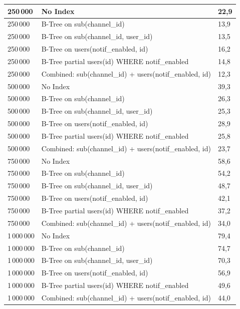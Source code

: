 \begin{longtable}{|p{2.4cm}|p{9.9cm}|p{2.3cm}|}
    \hline
    250\,000 & No Index & 22,9 \\
    \hline
    250\,000 & B-Tree on sub(channel\_id) & 13,9 \\
    \hline
    250\,000 & B-Tree on sub(channel\_id, user\_id) & 13,5 \\
    \hline
    250\,000 & B-Tree on users(notif\_enabled, id) & 16,2 \\
    \hline
    250\,000 & B-Tree partial users(id) WHERE notif\_enabled & 14,8 \\
    \hline
    250\,000 & Combined: sub(channel\_id) + users(notif\_enabled, id) & 12,3 \\
    \hline
    500\,000 & No Index & 39,3 \\
    \hline
    500\,000 & B-Tree on sub(channel\_id) & 26,3 \\
    \hline
    500\,000 & B-Tree on sub(channel\_id, user\_id) & 25,3 \\
    \hline
    500\,000 & B-Tree on users(notif\_enabled, id) & 28,9 \\
    \hline
    500\,000 & B-Tree partial users(id) WHERE notif\_enabled & 25,8 \\
    \hline
    500\,000 & Combined: sub(channel\_id) + users(notif\_enabled, id) & 23,7 \\
    \hline
    750\,000 & No Index & 58,6 \\
    \hline
    750\,000 & B-Tree on sub(channel\_id) & 54,2 \\
    \hline
    750\,000 & B-Tree on sub(channel\_id, user\_id) & 48,7 \\
    \hline
    750\,000 & B-Tree on users(notif\_enabled, id) & 42,1 \\
    \hline
    750\,000 & B-Tree partial users(id) WHERE notif\_enabled & 37,2 \\
    \hline
    750\,000 & Combined: sub(channel\_id) + users(notif\_enabled, id) & 34,0 \\
    \hline
    1\,000\,000 & No Index & 79,4 \\
    \hline
    1\,000\,000 & B-Tree on sub(channel\_id) & 74,7 \\
    \hline
    1\,000\,000 & B-Tree on sub(channel\_id, user\_id) & 70,3 \\
    \hline
    1\,000\,000 & B-Tree on users(notif\_enabled, id) & 56,9 \\
    \hline
    1\,000\,000 & B-Tree partial users(id) WHERE notif\_enabled & 49,6 \\
    \hline
    1\,000\,000 & Combined: sub(channel\_id) + users(notif\_enabled, id) & 44,0 \\
    \hline
\end{longtable}

